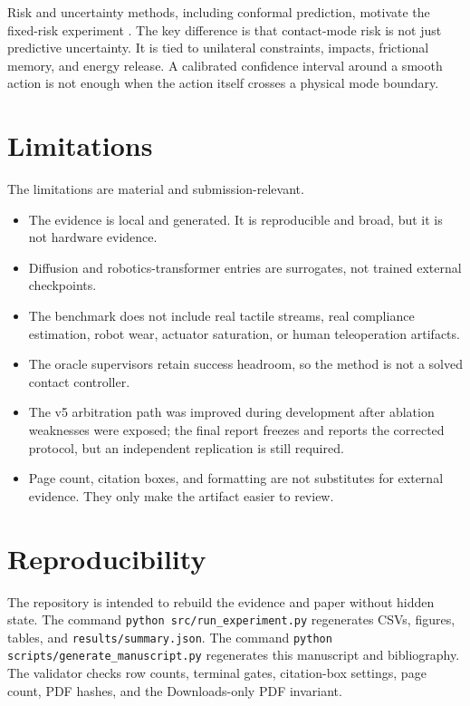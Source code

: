 \documentclass{article}
\begin{document}
Risk and uncertainty methods, including conformal prediction, motivate the fixed-risk experiment \citep{angelopoulos2021conformal,tibshirani2019conformal}. The key difference is that contact-mode risk is not just predictive uncertainty. It is tied to unilateral constraints, impacts, frictional memory, and energy release. A calibrated confidence interval around a smooth action is not enough when the action itself crosses a physical mode boundary.

\section{Limitations}
The limitations are material and submission-relevant.
\begin{itemize}[leftmargin=*]
\item The evidence is local and generated. It is reproducible and broad, but it is not hardware evidence.
\item Diffusion and robotics-transformer entries are surrogates, not trained external checkpoints.
\item The benchmark does not include real tactile streams, real compliance estimation, robot wear, actuator saturation, or human teleoperation artifacts.
\item The oracle supervisors retain success headroom, so the method is not a solved contact controller.
\item The v5 arbitration path was improved during development after ablation weaknesses were exposed; the final report freezes and reports the corrected protocol, but an independent replication is still required.
\item Page count, citation boxes, and formatting are not substitutes for external evidence. They only make the artifact easier to review.
\end{itemize}

\section{Reproducibility}
The repository is intended to rebuild the evidence and paper without hidden state. The command \texttt{python src/run\_experiment.py} regenerates CSVs, figures, tables, and \texttt{results/summary.json}. The command \texttt{python scripts/generate\_manuscript.py} regenerates this manuscript and bibliography. The validator checks row counts, terminal gates, citation-box settings, page count, PDF hashes, and the Downloads-only PDF invariant.
\end{document}
